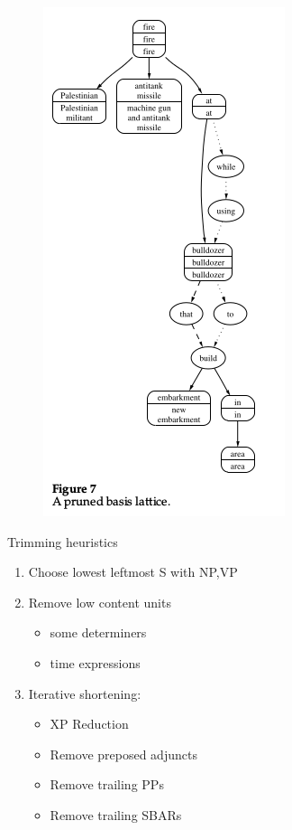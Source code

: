 \documentclass[xcolor={table}]{beamer}
\begin{document}
\begin{frame}[t]{\cite{barzilay2005sentence}}
      \begin{figure}[h]
          \centering
      \includegraphics[scale=.3]{images/figure7-barzilay05.png} \\
\end{figure}
\end{frame}

\begin{frame}[t]{\cite{zajic2006sentence}}
    Trimming heuristics 
    \begin{enumerate}
        \item Choose lowest leftmost S with NP,VP
        \item Remove low content units
            \begin{itemize}
                \item  some determiners
                \item time expressions
            \end{itemize}
        \item Iterative shortening:
            \begin{itemize}
                \item XP Reduction
                \item Remove preposed adjuncts
                \item Remove trailing PPs
                \item Remove trailing SBARs
            \end{itemize}
    \end{enumerate}
\end{frame}
\end{document}
